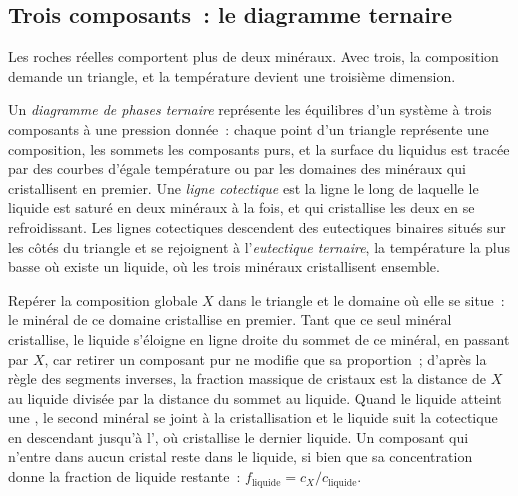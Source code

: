\subsection*{Trois composants~: le diagramme ternaire}

Les roches réelles comportent plus de deux minéraux. Avec trois, la composition demande un
triangle, et la température devient une troisième dimension.

\begin{definition}\label{def:b2:mantle-melting:ternary}
Un \emph{diagramme de phases ternaire} représente les
équilibres d'un système à trois composants à une pression donnée~: chaque point d'un
triangle représente une composition, les sommets les composants purs, et la surface du
liquidus est tracée par des courbes d'égale température ou par les domaines des minéraux
qui cristallisent en premier. Une \emph{ligne cotectique} est la ligne
le long de laquelle le liquide est saturé en deux minéraux à la fois, et qui cristallise les
deux en se refroidissant. Les lignes cotectiques descendent des eutectiques binaires situés
sur les côtés du triangle et se rejoignent
à l'\emph{eutectique ternaire}, la température la plus basse
où existe un liquide, où les trois minéraux cristallisent ensemble.
\end{definition}

\begin{method}\label{met:b2:mantle-melting:ternary}
Repérer la composition globale $X$ dans le triangle et le domaine où elle se situe~:
le minéral de ce domaine cristallise en premier. Tant que ce seul minéral cristallise,
le liquide s'éloigne en ligne droite du sommet de ce minéral, en passant par $X$,
car retirer un composant pur ne modifie que sa proportion~; d'après la règle des segments
inverses, la fraction massique de cristaux est la distance de $X$ au liquide divisée par la
distance du sommet au liquide. Quand le liquide atteint une , le second minéral
se joint à la cristallisation et le liquide suit la cotectique en descendant jusqu'à l', où cristallise le dernier liquide. Un composant qui n'entre dans aucun cristal reste
dans le liquide, si bien que sa concentration donne la fraction de liquide restante~:
$f_{\text{liquide}} = c_X/c_{\text{liquide}}$.
\end{method}

